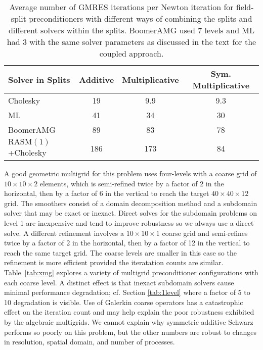 \documentclass[3p]{elsarticle}
\newcommand{\RASM}{\mathrm{RASM}}
\begin{document}
\begin{table}
  \centering\caption{Average number of GMRES iterations per Newton iteration for field-split preconditioners with different ways of combining the splits and different solvers within the splits.
BoomerAMG used 7 levels and ML had 3 with the same solver parameters as discussed in the text for the coupled approach.}\label{tab:fieldsplit}
  \begin{tabular}{l|ccc}
    Solver in Splits    & Additive & Multiplicative & Sym. Multiplicative \\ \hline
    Cholesky            & 19       & 9.9            & 9.3                 \\
    ML                  & 41       & 34             & 30                  \\
    BoomerAMG           & 89       & 83             & 78                  \\
    $\RASM(1)$+Cholesky & 186      & 173            & 84
  \end{tabular}
\end{table}

A good geometric multigrid for this problem uses four-levels with a coarse grid of $10\times 10\times 2$ elements, which is semi-refined twice by a factor of 2 in the horizontal, then by a factor of 6 in the vertical to reach the target $40\times 40\times 12$ grid.
The smoothers consist of a domain decomposition method and a subdomain solver that may be exact or inexact.
Direct solves for the subdomain problems on level 1 are inexpensive and tend to improve robustness so we always use a direct solve.
A different refinement involves a $10\times 10\times 1$ coarse grid and semi-refines twice by a factor of 2 in the horizontal, then by a factor of 12 in the vertical to reach the same target grid.
The coarse levels are smaller in this case so the refinement is more efficient provided the iteratation counts are similar.
Table~\ref{tab:xmg} explores a variety of multigrid preconditioner configurations with each coarse level.
A distinct effect is that inexact subdomain solvers cause minimal performance degradation; cf. Section \ref{tab:1level} where a factor of 5 to 10 degradation is visible.
Use of Galerkin coarse operators has a catastrophic effect on the iteration count and may help explain the poor robustness exhibited by the algebraic multigrids.
We cannot explain why symmetric additive Schwarz performs so poorly on this problem, but the other numbers are robust to changes in resolution, spatial domain, and number of processes.
\end{document}
